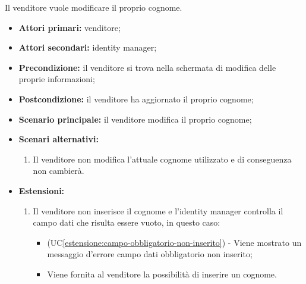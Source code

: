 \label{modifica-informazioni-venditore.cognome}

Il venditore vuole modificare il proprio cognome.
\begin{itemize}
	\item \textbf{Attori primari:} venditore;
	\item \textbf{Attori secondari:} identity manager;
	\item \textbf{Precondizione:} il venditore si trova nella schermata di modifica delle proprie informazioni;
	\item \textbf{Postcondizione:} il venditore ha aggiornato il proprio cognome;
	\item \textbf{Scenario principale:} il venditore modifica il proprio cognome;
	\item \textbf{Scenari alternativi:}
	\begin{enumerate}[label=\lett]
		\item Il venditore non modifica l'attuale cognome utilizzato e di conseguenza non cambierà.
	\end{enumerate}
	\item \textbf{Estensioni:}
	\begin{enumerate}[label=\lett]
		\item Il venditore non inserisce il cognome e l'identity manager controlla il campo dati che risulta essere vuoto, in questo caso:
		\begin{itemize}
			\item (UC\ref{estensione:campo-obbligatorio-non-inserito}) - Viene mostrato un messaggio d'errore campo dati obbligatorio non inserito;
			\item Viene fornita al venditore la possibilità di inserire un cognome.
		\end{itemize}
	\end{enumerate}
\end{itemize}

\label{modifica-informazioni-venditore.email}

